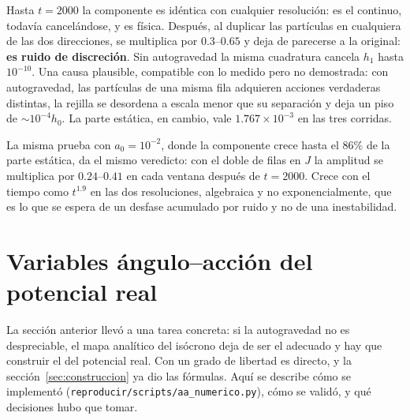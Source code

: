 \documentclass[11pt,a4paper]{article}
\newcommand{\Jr}{J}
\theoremstyle{definition}
\begin{document}
Hasta $t=2000$ la componente es idéntica con cualquier resolución: es el continuo,
todavía cancelándose, y es física. Después, al duplicar las partículas en cualquiera
de las dos direcciones, se multiplica por $0.3$--$0.65$ y deja de parecerse a la
original: \textbf{es
ruido de discreción}. Sin autogravedad la misma cuadratura cancela $h_1$ hasta
$10^{-10}$. Una causa plausible, compatible con lo medido pero no demostrada: con
autogravedad, las partículas de una misma fila adquieren acciones verdaderas
distintas, la rejilla se desordena a escala menor que su separación y deja un piso de
$\sim10^{-4}h_0$. La parte estática, en cambio, vale
$1.767\times10^{-3}$ en las tres corridas.

La misma prueba con $a_0=10^{-2}$, donde la componente crece hasta el $86\%$ de la
parte estática, da el mismo veredicto: con el doble de filas en $\Jr$ la amplitud se
multiplica por $0.24$--$0.41$ en cada ventana después de $t=2000$. Crece con el tiempo
como $t^{1.9}$ en las dos resoluciones, algebraica y no exponencialmente, que es lo
que se espera de un desfase acumulado por ruido y no de una inestabilidad.

\section{Variables ángulo--acción del potencial real}
\label{sec:mapanumerico}

La sección anterior llevó a una tarea concreta: si la autogravedad no es
despreciable, el mapa analítico del isócrono deja de ser el adecuado y hay que
construir el del potencial real. Con un grado de libertad es directo, y la
sección~\ref{sec:construccion} ya dio las fórmulas. Aquí se describe cómo se
implementó (\texttt{reproducir/scripts/aa\_numerico.py}), cómo se validó, y qué
decisiones hubo que tomar.
\end{document}
